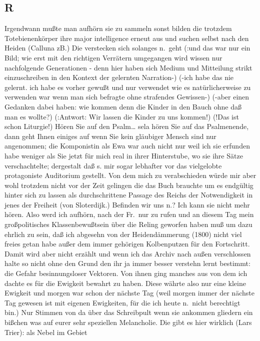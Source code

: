 \documentclass[
]{article}
\author{}
\date{\vspace{-2.5em}}
\begin{document}
\subsection{R}\label{r}

Irgendwann mußte man aufhörn sie zu sammeln sonst bilden die trotzdem
Totebienenkörper ihre major intelligence erneut aus und suchen selbst
nach den Heiden (Calluna zB.) Die verstecken sich solanges n.~geht (:und
das war nur ein Bild; wie erst mit den richtigen Verrätern umgegangen
wird wissen nur nachfolgende Generationen - denn hier haben sich Medium
und Mitteilung strikt einzuschreiben in den Kontext der gelernten
Narration-) (-ich habe das nie gelernt. ich habe es vorher gewußt und
nur verwendet wie es natürlicherweise zu verwenden war wenn man sich
befragte ohne strafendes Gewissen-) (-aber einen Gedanken dabei haben:
wie kommen denn die Kinder in den Bauch ohne daß man es wollte?)
(:Antwort: Wir lassen die Kinder zu uns kommen!) (!Das ist schon
Liturgie!) Hören Sie auf den Psalm\ldots{} sela hören Sie auf das
Psalmenende, dann geht Ihnen einiges auf wenn Sie kein gläubiger Mensch
sind nur angenommen; die Komponistin als Ewa war auch nicht nur weil ich
sie erfunden habe weniger als Sie jetzt für mich real in ihrer
Hinterstube, wo sie ihre Sätze verschachtelte; dergestalt daß s. mir
sogar lebhafter vor das vielgelobte protagoniste Auditorium gestellt.
Von dem mich zu verabschieden würde mir aber wohl trotzdem nicht vor der
Zeit gelingen die das Buch brauchte um es endgültig hinter sich zu
lassen als durchschrittene Passage des Reichs der Notwendigkeit in jenes
der Freiheit (von Sloterdijk.) Befinden wir uns n.? Ich kann sie nicht
mehr hören. Also werd ich aufhörn, nach der Fr.~nur zu rufen und an
diesem Tag mein großpolitisches Klassenbewußtsein über die Reling
geworfen haben muß um dazu ehrlich zu sein, daß ich abgesehn von der
Heidendämmerung (1800) nicht viel freies getan habe außer dem immer
gehörigen Kolbenputzen für den Fortschritt. Damit wird aber nicht
erzählt und wenn ich das Archiv nach außen verschlossen halte so nicht
ohne den Grund den ihr ja immer besser verstehn lernt bestimmt: die
Gefahr besinnungsloser Vektoren. Von ihnen ging manches aus von dem ich
dachte es für die Ewigkeit bewahrt zu haben. Diese währte also nur eine
kleine Ewigkeit und morgen war schon der nächste Tag (weil morgen immer
der nächste Tag gewesen ist mit eigenen Ewigkeiten, für die ich heute
n.~nicht berechtigt bin.) Nur Stimmen von da über das Schreibpult wenn
sie ankommen gliedern ein bißchen was auf eurer sehr speziellen
Melancholie. Die gibt es hier wirklich (Lars Trier): als Nebel im Gebiet
\end{document}
